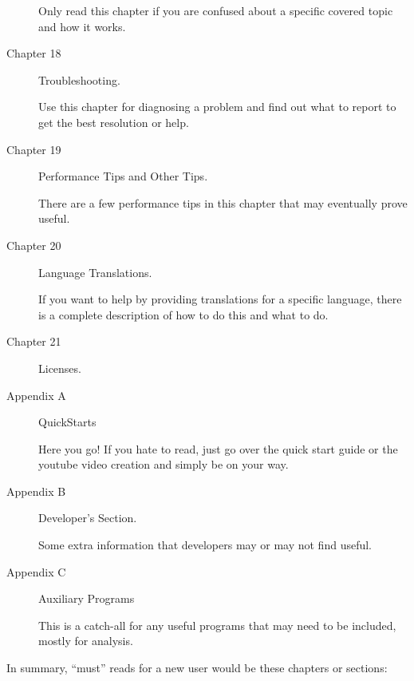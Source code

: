 \begin{description}
        Only read this chapter if you are confused about a specific covered topic and how it works.

    \item[Chapter 18] Troubleshooting.

        Use this chapter for diagnosing a problem and find out what to report to get the best resolution or help.

    \item[Chapter 19]  Performance Tips and Other Tips.

        There are a few performance tips in this chapter that may eventually prove useful.

    \item[Chapter 20] Language Translations.

        If you want to help by providing translations for a specific language, there is a complete description of how to do this and what to do.

    \item[Chapter 21] Licenses.

    \item[Appendix A] QuickStarts

        Here you go! If you hate to read, just go over the quick start guide or the youtube video creation and simply be on your way.

    \item[Appendix B] Developer’s Section.

        Some extra information that developers may or may not find useful.

    \item[Appendix C] Auxiliary Programs

        This is a catch-all for any useful programs that may need to be included, mostly for analysis.

\end{description}

In summary, “must” reads for a new user would be these chapters or sections:

